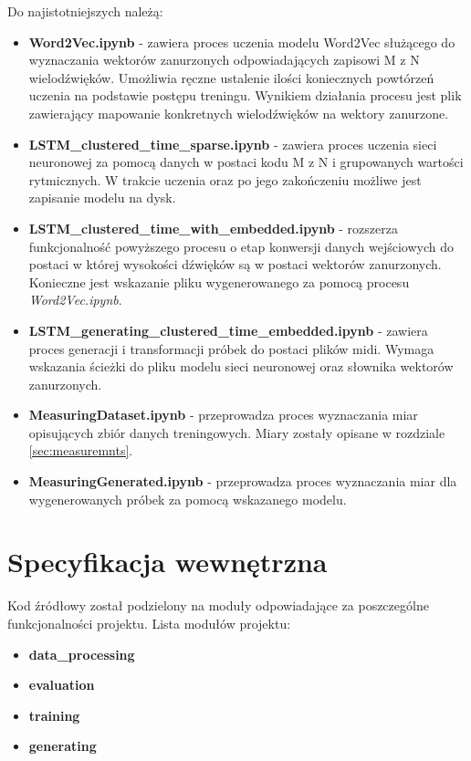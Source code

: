 {{        Do najistotniejszych należą:
        \begin{itemize}
            \setlength\itemsep{-0.5em}
            \item {\textbf {{Word2Vec.ipynb}}} - zawiera proces uczenia modelu Word2Vec służącego do wyznaczania wektorów zanurzonych odpowiadających zapisowi M\,\,z\,\,N wielodźwięków. Umożliwia ręczne ustalenie ilości koniecznych powtórzeń uczenia na podstawie postępu treningu. Wynikiem działania procesu jest plik zawierający mapowanie konkretnych wielodźwięków na wektory zanurzone.
            \item {\textbf {{LSTM\_clustered\_time\_sparse.ipynb}}} - zawiera proces uczenia sieci neuronowej za pomocą danych w postaci kodu M\,\,z\,\,N i grupowanych wartości rytmicznych. W trakcie uczenia oraz po jego zakończeniu możliwe jest zapisanie modelu na dysk.
            \item {\textbf {{LSTM\_clustered\_time\_with\_embedded.ipynb}}} - rozszerza funkcjonalność powyższego procesu o etap konwersji danych wejściowych do postaci w której wysokości dźwięków są w postaci wektorów zanurzonych. Konieczne jest wskazanie pliku wygenerowanego za pomocą procesu {\textit {{Word2Vec.ipynb}}}.
            \item {\textbf {LSTM\_generating\_clustered\_time\_embedded.ipynb}} - zawiera proces generacji i transformacji próbek do postaci plików midi. Wymaga wskazania ścieżki do pliku modelu sieci neuronowej oraz słownika wektorów zanurzonych.
            \item {\textbf {{MeasuringDataset.ipynb}}} - przeprowadza proces wyznaczania miar opisujących zbiór danych treningowych. Miary zostały opisane w rozdziale \ref{sec:measuremnts}.
            \item {\textbf {{MeasuringGenerated.ipynb}}} - przeprowadza proces wyznaczania miar dla wygenerowanych próbek za pomocą wskazanego modelu. 
        \end{itemize}
    }

    \section{Specyfikacja wewnętrzna}
    {
        Kod źródłowy został podzielony na moduły odpowiadające za poszczególne funkcjonalności projektu. Lista modułów projektu:

        \begin{itemize}
            \setlength\itemsep{-0.5em}
            \item {\textbf {data\_processing}} 
            \item {\textbf {evaluation}}
            \item {\textbf {training}}
            \item {\textbf {generating}}
        \end{itemize}

}}
